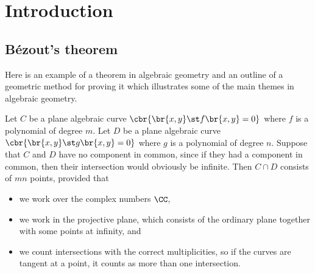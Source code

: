

\newcommand{\rational}[5][]{
  \ifx &#1&
    \begin{array}{rcl}
      #2 & \dashrightarrow & #3 \\
      #4 & \longmapsto     & #5
    \end{array}
  \else
    \begin{array}{ccrcl}
      #1 & : & #2 & \dashrightarrow & #3 \\
         &   & #4 & \longmapsto     & #5
    \end{array}
  \fi
}





\section{Introduction}

\subsection{B\'ezout's theorem}


Here is an example of a theorem in algebraic geometry and an outline of a geometric method for proving it which illustrates some of the main themes in algebraic geometry.

\begin{theorem}[B\'ezout]
Let $ C $ be a plane algebraic curve $ \cbr{\br{x, y} \st f\br{x, y} = 0} $ where $ f $ is a polynomial of degree $ m $. Let $ D $ be a plane algebraic curve $ \cbr{\br{x, y} \st g\br{x, y} = 0} $ where $ g $ is a polynomial of degree $ n $. Suppose that $ C $ and $ D $ have no component in common, since if they had a component in common, then their intersection would obviously be infinite. Then $ C \cap D $ consists of $ mn $ points, provided that
\begin{itemize}
\item we work over the complex numbers $ \CC $,
\item we work in the projective plane, which consists of the ordinary plane together with some points at infinity, and
\item we count intersections with the correct multiplicities, so if the curves are tangent at a point, it counts as more than one intersection.
\end{itemize}
\end{theorem}

